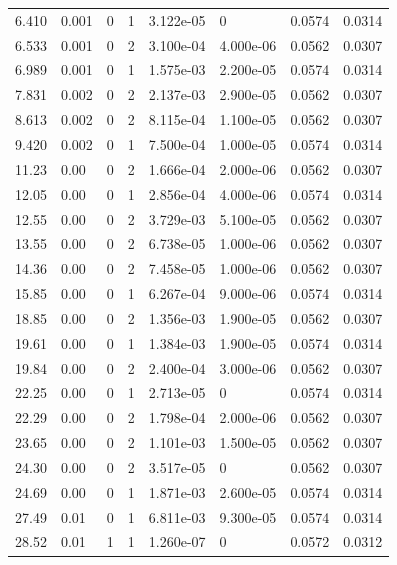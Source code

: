 \documentclass[preview]{standalone}
\begin{document}
{{\begin{tabular}{L{1.2cm}C{1.2cm} C{0.3cm}C{0.5cm} C{1.4cm}C{1.4cm} C{1.4cm}C{1.4cm}}
  6.410  &  0.001  & 0     &  1 &  3.122e-05  & 0  & 0.0574 &  0.0314   \\ 
  6.533  &  0.001  & 0     &  2 &  3.100e-04  & 4.000e-06  & 0.0562 &  0.0307   \\ 
  6.989  &  0.001  & 0     &  1 &  1.575e-03  & 2.200e-05  & 0.0574 &  0.0314   \\ 
  7.831  &  0.002  & 0     &  2 &  2.137e-03  & 2.900e-05  & 0.0562 &  0.0307   \\ 
  8.613  &  0.002  & 0     &  2 &  8.115e-04  & 1.100e-05  & 0.0562 &  0.0307   \\ 
  9.420  &  0.002  & 0     &  1 &  7.500e-04  & 1.000e-05  & 0.0574 &  0.0314   \\ 
  11.23  &  0.00  & 0     &  2 &  1.666e-04  & 2.000e-06  & 0.0562 &  0.0307   \\ 
  12.05  &  0.00  & 0     &  1 &  2.856e-04  & 4.000e-06  & 0.0574 &  0.0314   \\ 
  12.55  &  0.00  & 0     &  2 &  3.729e-03  & 5.100e-05  & 0.0562 &  0.0307   \\ 
  13.55  &  0.00  & 0     &  2 &  6.738e-05  & 1.000e-06  & 0.0562 &  0.0307   \\ 
  14.36  &  0.00  & 0     &  2 &  7.458e-05  & 1.000e-06  & 0.0562 &  0.0307   \\ 
  15.85  &  0.00  & 0     &  1 &  6.267e-04  & 9.000e-06  & 0.0574 &  0.0314   \\ 
  18.85  &  0.00  & 0     &  2 &  1.356e-03  & 1.900e-05  & 0.0562 &  0.0307   \\ 
  19.61  &  0.00  & 0     &  1 &  1.384e-03  & 1.900e-05  & 0.0574 &  0.0314   \\ 
  19.84  &  0.00  & 0     &  2 &  2.400e-04  & 3.000e-06  & 0.0562 &  0.0307   \\ 
  22.25  &  0.00  & 0     &  1 &  2.713e-05  & 0  & 0.0574 &  0.0314   \\ 
  22.29  &  0.00  & 0     &  2 &  1.798e-04  & 2.000e-06  & 0.0562 &  0.0307   \\ 
  23.65  &  0.00  & 0     &  2 &  1.101e-03  & 1.500e-05  & 0.0562 &  0.0307   \\ 
  24.30  &  0.00  & 0     &  2 &  3.517e-05  & 0  & 0.0562 &  0.0307   \\ 
  24.69  &  0.00  & 0     &  1 &  1.871e-03  & 2.600e-05  & 0.0574 &  0.0314   \\ 
  27.49  &  0.01  & 0     &  1 &  6.811e-03  & 9.300e-05  & 0.0574 &  0.0314   \\ 
  28.52  &  0.01  & 1     &  1 &  1.260e-07  & 0  & 0.0572 &  0.0312   \\ 

\end{tabular}}}
\end{document}
